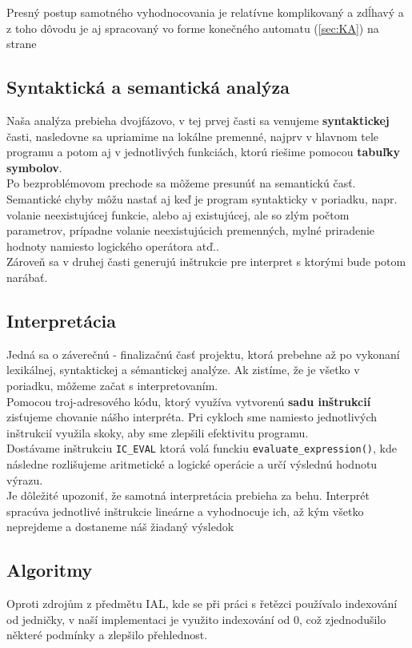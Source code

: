 \documentclass[12pt, a4paper]{article}
\begin{document}
	        Presný postup samotného vyhodnocovania je relatívne komplikovaný a zdĺhavý a z toho dôvodu je aj spracovaný vo forme konečného automatu (\ref{sec:KA}) na strane \pageref{sec:KA}

        \subsection{Syntaktická a semantická analýza}
	        Naša analýza prebieha dvojfázovo, v tej prvej časti sa venujeme \textbf{syntaktickej} časti, nasledovne sa upriamime na lokálne premenné, najprv v hlavnom tele programu a potom aj v jednotlivých funkciách, ktorú riešime pomocou \textbf{tabuľky symbolov}.\\
	        Po bezproblémovom prechode sa môžeme presunúť na semantickú časť. Semantické chyby môžu nastať aj keď je program syntakticky v poriadku, napr. volanie neexistujúcej funkcie, alebo aj existujúcej, ale so zlým počtom parametrov, prípadne volanie neexistujúcich premenných, mylné priradenie hodnoty namiesto logického operátora atď..\\
	        Zároveň sa v druhej časti generujú inštrukcie pre interpret s ktorými bude potom narábať.
	        
        \subsection{Interpretácia}
	        Jedná sa o záverečnú - finalizačnú časť projektu, ktorá prebehne až po vykonaní lexikálnej, syntaktickej a sémantickej analýze. Ak zistíme, že je všetko v poriadku, môžeme začat s interpretovaním.\\
	        Pomocou troj-adresového kódu, ktorý využíva  vytvorenú \textbf{sadu inštrukcií} zisťujeme chovanie nášho interpréta. Pri cykloch sme namiesto jednotlivých inštrukcií využila skoky, aby sme zlepšili efektivitu programu.\\
	        Dostávame inštrukciu \verb|IC_EVAL| ktorá volá funckiu \verb|evaluate_expression()|, kde následne rozlišujeme aritmetické a logické operácie a určí výslednú hodnotu výrazu.\\
	        Je dôležité upozoniť, že samotná interpretácia prebieha za behu. Interprét spracúva jednotlivé inštrukcie lineárne a vyhodnocuje ich, až kým všetko neprejdeme a dostaneme náš žiadaný výsledok

        \subsection{Algoritmy}
        Oproti zdrojům z předmětu IAL, kde se při práci s řetězci používalo indexování od jedničky, v naší implementaci je využito indexování od 0, což zjednodušilo některé podmínky a zlepšilo přehlednost.
\end{document}

